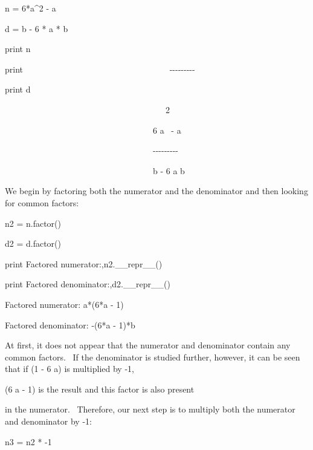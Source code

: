 \documentclass[12pt,twoside]{book}
\begin{document}
n = 6*a\^{}2 {}- a

d = b {}- 6 * a * b

print n

print {\textquotedbl}
\ \ \ \ \ \ \ \ \ \ \ \ \ \ \ \ \ \ \ \ \ \ \ \ \ \ \ \ \ \ \ \ \ \ {}-{}-{}-{}-{}-{}-{}-{}-{}-{\textquotedbl}

print d

{\textbar}

\ \ \ \ \ \ \ \ \ \ \ \ \ \ \ \ \ \ \ \ \ \ \ \ \ \ \ \ \ \ \ \ \ \ \ \ \ \ 2

\ \ \ \ \ \ \ \ \ \ \ \ \ \ \ \ \ \ \ \ \ \ \ \ \ \ \ \ \ \ \ \ \ \ \ 6
a \ {}- a

\ \ \ \ \ \ \ \ \ \ \ \ \ \ \ \ \ \ \ \ \ \ \ \ \ \ \ \ \ \ \ \ \ \ \ {}-{}-{}-{}-{}-{}-{}-{}-{}-

\ \ \ \ \ \ \ \ \ \ \ \ \ \ \ \ \ \ \ \ \ \ \ \ \ \ \ \ \ \ \ \ \ \ \ b
{}- 6 a b


\bigskip

{\textquotedbl}{\textquotedbl}{\textquotedbl}

We begin by factoring both the numerator and the denominator and then looking for common factors:

{\textquotedbl}{\textquotedbl}{\textquotedbl}

n2 = n.factor()

d2 = d.factor()

print {\textquotedbl}Factored numerator:{\textquotedbl},n2.\_\_repr\_\_()

print {\textquotedbl}Factored denominator:{\textquotedbl},d2.\_\_repr\_\_()

{\textbar}

Factored numerator: a*(6*a {}- 1)

Factored denominator: {}-(6*a {}- 1)*b


\bigskip

{\textquotedbl}{\textquotedbl}{\textquotedbl}

At first, it does not appear that the numerator and denominator contain any common factors. \ If the denominator is studied further, however, it can be seen that if (1 {}- 6 a) is multiplied by {}-1, 

(6 a {}- 1) is the result and this factor is also present

in the numerator. \ Therefore, our next step is to multiply both the numerator and denominator by {}-1:

{\textquotedbl}{\textquotedbl}{\textquotedbl}

n3 = n2 * {}-1
\end{document}
